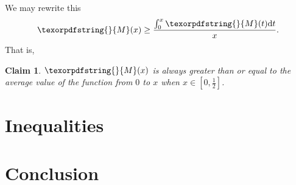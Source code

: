 \documentclass[12pt]{ucthesis}
\theoremstyle{plain}
\newtheorem{claim}{Claim}
\theoremstyle{definition}
\newcommand{\takagi}{
  \texorpdfstring{\protect}{M}
}
\begin{document}
We may rewrite this
\begin{equation*}
\takagi(x) \ge \frac{\int_0^x \takagi(t) \mathrm{d}t}{x}.
\end{equation*}
That is,
\begin{claim}
\label{Claim 2}
$\takagi(x)$ is always greater than or equal to the average value of the function
from $0$ to $x$ when $x \in [0, \frac{1}{2}]$.
\end{claim}

\chapter{Inequalities}
\label{Chapter 4}

\chapter{Conclusion}
\label{Chapter 5}
\end{document}
